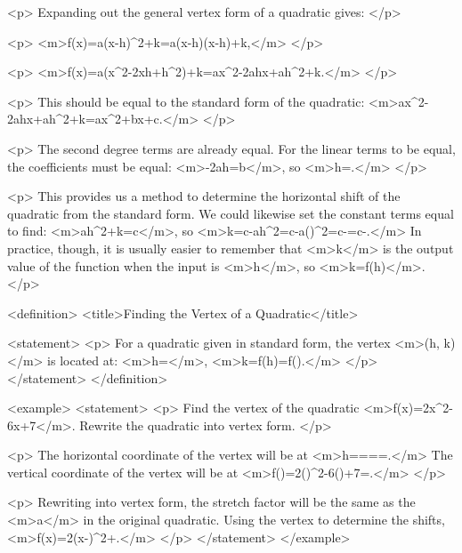         <p>
            Expanding out the general vertex form of a quadratic gives:
        </p>

        <p>
            <m>f(x)=a(x-h)^{2}+k=a(x-h)(x-h)+k,</m>
        </p>

        <p>
            <m>f(x)=a(x^{2}-2xh+h^{2})+k=ax^{2}-2ahx+ah^{2}+k.</m>
        </p>

        <p>
            This should be equal to the standard form of the quadratic: <m>ax^{2}-2ahx+ah^{2}+k=ax^{2}+bx+c.</m>
        </p>

        <p>
            The second degree terms are already equal.
            For the linear terms to be equal, the coefficients must be equal: <m>-2ah=b</m>, so <m>h=.</m>
        </p>

        <p>
            This provides us a method to determine the horizontal shift of the quadratic from the standard form.
            We could likewise set the constant terms equal to find: <m>ah^{2}+k=c</m>, so <m>k=c-ah^{2}=c-a()^{2}=c-=c-.</m> In practice, though, it is usually easier to remember that <m>k</m> is the output value of the function when the input is <m>h</m>, so <m>k=f(h)</m>.
        </p>

        <definition>
            <title>Finding the Vertex of a Quadratic</title>

            <statement>
                <p>
                    For a quadratic given in standard form, the vertex <m>(h, k)</m> is located at: <m>h=</m>, <m>k=f(h)=f().</m>
                </p>
            </statement>
        </definition>

        <example>
            <statement>
                <p>
                    Find the vertex of the quadratic <m>f(x)=2x^{2}-6x+7</m>.
                    Rewrite the quadratic into vertex form.
                </p>

                <p>
                    The horizontal coordinate of the vertex will be at <m>h====.</m> The vertical coordinate of the vertex will be at <m>f()=2()^{2}-6()+7=.</m>
                </p>

                <p>
                    Rewriting into vertex form, the stretch factor will be the same as the <m>a</m> in the original quadratic.
                    Using the vertex to determine the shifts, <m>f(x)=2(x-)^{2}+.</m>
                </p>
            </statement>
        </example>

